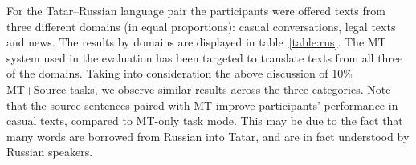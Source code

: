 \documentclass[11pt]{article}
\begin{document}
For the Tatar--Russian language pair the participants were offered texts from three different domains (in equal proportions): casual conversations, legal texts and news. The results by domains are displayed in table~\ref{table:rus}. The MT system used in the evaluation has been targeted to translate texts from all three of the domains. Taking into consideration the above discussion of 10\% MT+Source tasks, we observe similar results across the three categories. Note that the source sentences paired with MT improve participants' performance in casual texts, compared to MT-only task mode. This may be due to the fact that many words are borrowed from Russian into Tatar, and are in fact understood by Russian speakers.




\end{document}
